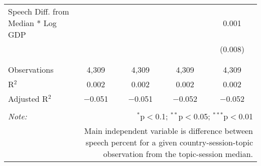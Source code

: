 \begin{table}[!htbp]
\begin{tabular}{@{\extracolsep{5pt}}lcccc}
 Speech Diff. from Median * Log GDP &  &  &  & 0.001 \\ 
  &  &  &  & (0.008) \\ 
  & & & & \\ 
\hline \\[-1.8ex] 
Observations & 4,309 & 4,309 & 4,309 & 4,309 \\ 
R$^{2}$ & 0.002 & 0.002 & 0.002 & 0.002 \\ 
Adjusted R$^{2}$ & $-$0.051 & $-$0.051 & $-$0.052 & $-$0.052 \\ 
\hline 
\hline \\[-1.8ex] 
\textit{Note:}  & \multicolumn{4}{r}{$^{*}$p$<$0.1; $^{**}$p$<$0.05; $^{***}$p$<$0.01} \\ 
 & \multicolumn{4}{r}{Main independent variable is difference between speech percent for a given country-session-topic observation from the topic-session median.} \\ 
\end{tabular} 
\end{table} 
